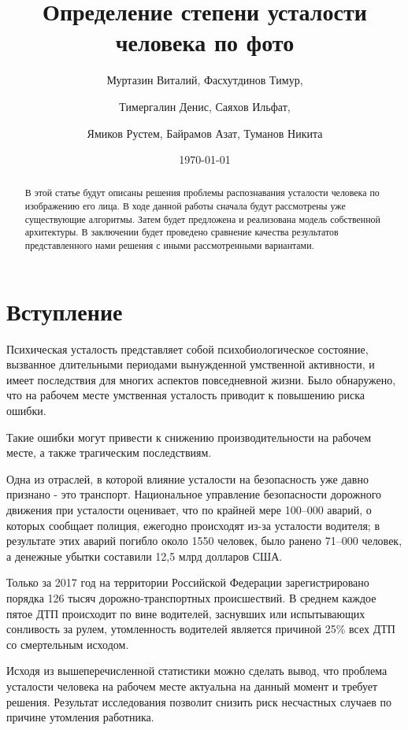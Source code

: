 \documentclass[12pt, letterpaper]{article}
\title{Определение степени усталости человека по фото}
\date{\today}
\author{Муртазин Виталий, Фасхутдинов Тимур, \and
    Тимергалин Денис, Саяхов Ильфат, \and
    Ямиков Рустем, Байрамов Азат, Туманов Никита
}
\begin{document}
    \maketitle

    \begin{abstract}
    В этой статье будут описаны решения проблемы распознавания усталости человека по изображению его лица.
    В ходе данной работы сначала будут рассмотрены уже существующие алгоритмы.
    Затем будет предложена и реализована модель собственной архитектуры.
    В заключении будет проведено сравнение качества результатов представленного нами решения с иными рассмотренными вариантами.
    \end{abstract}
    
    \section{Вступление}\label{sec:introduction}
    Психическая усталость представляет собой психобиологическое состояние, вызванное длительными периодами вынужденной умственной активности, и имеет последствия для многих аспектов повседневной жизни.
    Было обнаружено, что на рабочем месте умственная усталость приводит к повышению риска ошибки.

    Такие ошибки могут привести к снижению производительности на рабочем месте, а также трагическим последствиям.

    Одна из отраслей, в которой влияние усталости на безопасность уже давно признано - это транспорт.
    Национальное управление безопасности дорожного движения при усталости оценивает, что по крайней мере 100--000 аварий, о которых сообщает полиция, ежегодно происходят из-за усталости водителя;
    в результате этих аварий погибло около 1550 человек, было ранено 71--000 человек, а денежные убытки составили 12,5 млрд долларов США.

    Только за 2017 год на территории Российской Федерации зарегистрировано порядка 126 тысяч дорожно-транспортных происшествий.
    В среднем каждое пятое ДТП происходит по вине водителей, заснувших или испытывающих сонливость за рулем, утомленность водителей является причиной 25\% всех ДТП со смертельным исходом.

    Исходя из вышеперечисленной статистики можно сделать вывод, что проблема усталости человека на рабочем месте актуальна на данный момент и требует решения.
    Результат исследования позволит снизить риск несчастных случаев по причине утомления работника.
\end{document}
